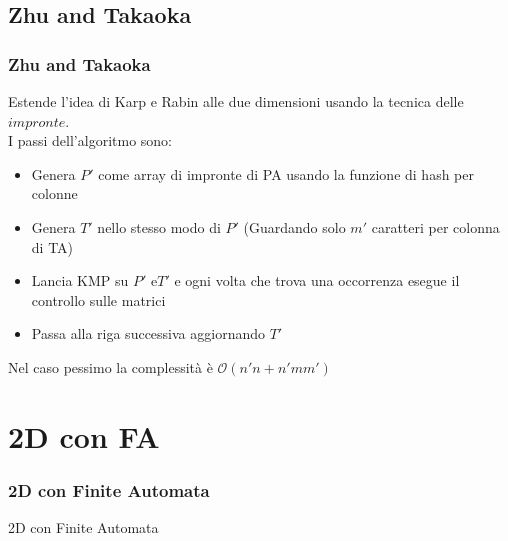 \documentclass{beamer}
\newcommand{\bigO}{\ensuremath{\mathcal{O}}} %
\begin{document}
\subsection{Zhu and Takaoka}
\begin{frame}
\frametitle{Zhu and Takaoka}

Estende l'idea di Karp e Rabin alle due dimensioni usando la tecnica delle $impronte$.\\
I passi dell'algoritmo sono:
\begin{itemize}
\item Genera $P'$ come array di impronte di PA usando la funzione di hash per colonne
\item Genera $T'$ nello stesso modo di $P'$ (Guardando solo $m'$ caratteri per colonna di TA)
\item Lancia KMP su $P'$ e$T'$ e ogni volta che trova una occorrenza esegue il controllo sulle matrici
\item Passa alla riga successiva aggiornando $T'$
\end{itemize}

Nel caso pessimo la complessità è $\bigO{(n'n + n'mm')}$

\end{frame}


\section{2D con FA}

\begin{frame}
\frametitle{2D con Finite Automata}
\Huge{\centerline{2D con Finite Automata}}
\end{frame}
\end{document}
